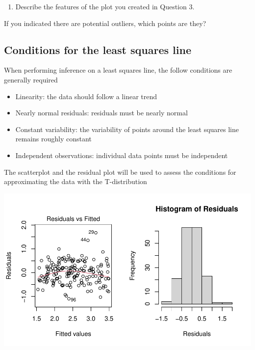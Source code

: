 \documentclass[
]{report}
\providecommand{\tightlist}{%
  \setlength{\itemsep}{0pt}\setlength{\parskip}{0pt}}
\begin{document}
\begin{enumerate}
\def\labelenumi{\arabic{enumi}.}
\setcounter{enumi}{3}
\tightlist
\item
  Describe the features of the plot you created in Question 3.
\end{enumerate}

\vspace{1in}

If you indicated there are potential outliers, which points are they?

\hypertarget{conditions-for-the-least-squares-line}{%
\subsection{Conditions for the least squares line}\label{conditions-for-the-least-squares-line}}

When performing inference on a least squares line, the follow conditions are generally required

\begin{itemize}
\tightlist
\item
  Linearity: the data should follow a linear trend
\item
  Nearly normal residuals: residuals must be nearly normal
\item
  Constant variability: the variability of points around the least squares line remains roughly constant
\item
  Independent observations: individual data points must be independent
\end{itemize}

The scatterplot and the residual plot will be used to assess the conditions for approximating the data with the T-distribution

\begin{center}\includegraphics[width=0.7\linewidth]{10-regression_files/figure-latex/unnamed-chunk-3-1} \end{center}
\end{document}

